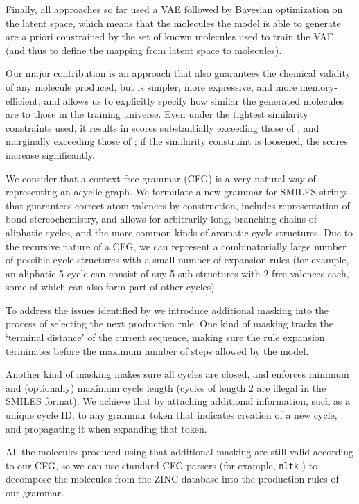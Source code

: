 \documentclass{article}
\begin{document}
Finally, all approaches so far used a VAE \cite{kingmawelling14} followed by Bayesian optimization on the latent space, which means that the molecules the model is able to generate are a priori constrained by the set of known molecules used to train the VAE (and thus to define the mapping from latent space to molecules).
 
Our major contribution is an approach that also guarantees the chemical validity of any molecule produced, but is simpler, more expressive, and more memory-efficient, and allows us to explicitly specify how similar the generated molecules are to those in the training universe. Even under the tightest similarity constraints used, it results in scores substantially exceeding those of \cite{jin18}, and marginally exceeding those of \cite{kajino18}; if the similarity constraint is loosened, the scores increase significantly.
 
We consider that a context free grammar (CFG) is a very natural way of representing an acyclic graph. We formulate a new grammar for SMILES strings that guarantees correct atom valences by construction, includes representation of bond stereochemistry, and allows for arbitrarily long, branching chains of aliphatic cycles, and the more common kinds of aromatic cycle structures. Due to the recursive nature of a CFG, we can represent a combinatorially large number of possible cycle structures with a small number of expansion rules (for example, an aliphatic 5-cycle can consist of any 5 sub-structures with 2 free valences each, some of which can also form part of other cycles).
 
To address the issues identified by \cite{kusner17}  we introduce additional masking into the process of selecting the next production rule. One kind of masking tracks the `terminal distance' of the current sequence, making sure the rule expansion terminates before the maximum number of steps allowed by the model. 
 
Another kind of masking makes sure all cycles are closed, and enforces minimum and (optionally) maximum cycle length (cycles of length 2 are illegal in the SMILES format). We achieve that by attaching additional information, such as a unique cycle ID, to any grammar token that indicates creation of a new cycle, and propagating it when expanding that token.
 
All the molecules produced using that additional masking are still valid according to our CFG, so we can use standard CFG parsers (for example, \verb|nltk| \cite{BirdKleinLoper09NLTK}) to decompose the molecules from the ZINC database \cite{Weininger88} into the production rules of our grammar.
 
\end{document}
